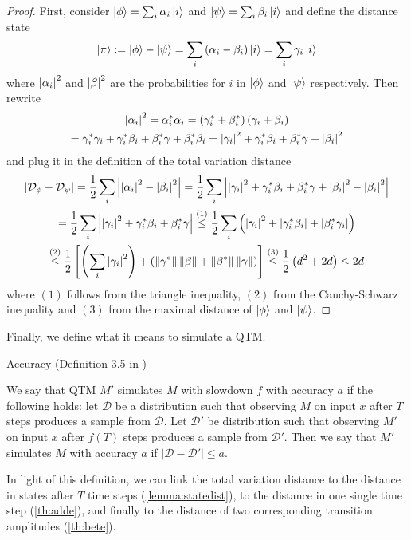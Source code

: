 \begin{lemma}
\begin{proof}
First, consider $\ket{\phi}=\sum_i\alpha_i\ket{i}$ and $\ket{\psi}=\sum_i\beta_i\ket{i}$ and 
define the distance state
\begin{equation}
    \ket{\pi}
    :=\ket{\phi}-\ket{\psi}
    =\sum_i\left(\alpha_i-\beta_i\right)\ket{i}
    =\sum_i\gamma_i\ket{i}
\end{equation}
where $\left\vert\alpha_i\right\vert^2$ and $\left\vert\beta\right\vert^2$ are the probabilities for $i$ in $\ket{\phi}$ and $\ket{\psi}$ respectively.
Then rewrite
\begin{multline}
    \left\vert\alpha_i\right\vert^2
    =\alpha^*_i\alpha_i
    =\left(\gamma^*_i+\beta^*_i\right)\left(\gamma_i+\beta_i\right)
    \\
    =\gamma^*_i\gamma_i+\gamma^*_i\beta_i+\beta^*_i\gamma+\beta^*_i\beta_i
    =\left\vert\gamma_i\right\vert^2+\gamma^*_i\beta_i+\beta^*_i\gamma+\left\vert\beta_i\right\vert^2
\end{multline}
and plug it in the definition of the total variation distance
\begin{multline}
    \left\vert\mathcal{D}_\phi-\mathcal{D}_\psi\right\vert
    =\frac{1}{2}\sum_i\left\vert\left\vert\alpha_i\right\vert^2-\left\vert\beta_i\right\vert^2\right\vert
    =\frac{1}{2}\sum_i\left\vert\left\vert\gamma_i\right\vert^2+\gamma^*_i\beta_i+\beta^*_i\gamma+\left\vert\beta_i\right\vert^2-\left\vert\beta_i\right\vert^2\right\vert
    \\
    =\frac{1}{2}\sum_i\left\vert\left\vert\gamma_i\right\vert^2+\gamma^*_i\beta_i+\beta^*_i\gamma\right\vert
    \overset{(1)}{\leq}\frac{1}{2}\sum_i\left(\left\vert\gamma_i\right\vert^2+\left\vert\gamma^*_i\beta_i\right\vert+\left\vert\beta^*_i\gamma_i\right\vert\right)
    \\
    \overset{(2)}{\leq}\frac{1}{2}\left[\left(\sum_i\left\vert\gamma_i\right\vert^2\right)+\left(\left\lVert\gamma^*\right\rVert\left\lVert\beta\right\rVert+\left\lVert\beta^*\right\rVert\left\lVert\gamma\right\rVert\right)\right]
    \overset{(3)}{\leq}\frac{1}{2}\left(d^2+2d\right)
    \leq 2d
\end{multline}
where $(1)$ follows from the triangle inequality, $(2)$ from the Cauchy-Schwarz inequality and $(3)$ from the maximal distance of $\ket{\phi}$ and $\ket{\psi}$.
\end{proof}
\end{lemma}

Finally, we define what it means to simulate a \ac{QTM}.
\begin{definition}
Accuracy (Definition 3.5 in \cite{bernstein_vazirani_1997})

We say that \ac{QTM} $M'$ simulates $M$ with slowdown $f$ with accuracy $a$ if the following holds: let $\mathcal{D}$ be a distribution such that observing $M$ on input $x$ after $T$ steps produces a sample from $\mathcal{D}$. Let $\mathcal{D}'$ be distribution such that observing $M'$ on input $x$ after $f(T)$ steps produces a sample from $\mathcal{D}'$. Then we say that $M'$ simulates $M$ with accuracy $a$ if $\vert\mathcal{D}-\mathcal{D}'\vert\leq a$.
\end{definition}
In light of this definition, we can link the total variation distance to the distance in states after $T$ time steps (\cref{lemma:statedist}), to the distance in one single time step (\cref{th:adde}), and finally to the distance of two corresponding transition amplitudes (\cref{th:bete}).

